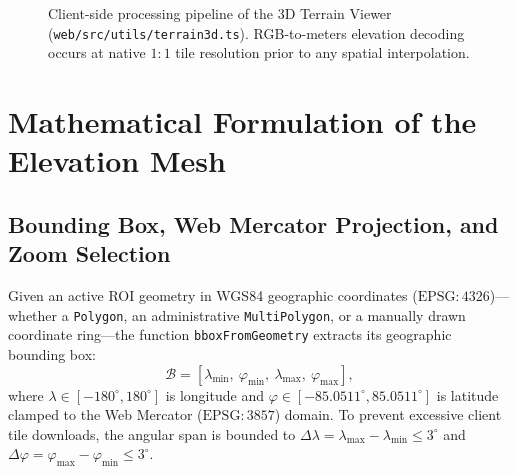 \documentclass[11pt,a4paper]{article}
\newcommand{\src}[1]{\nolinkurl{#1}}
\begin{document}
\begin{figure}[htbp]
\centering
{}
\caption{Client-side processing pipeline of the 3D Terrain Viewer (\src{web/src/utils/terrain3d.ts}).
RGB-to-meters elevation decoding occurs at native $1:1$ tile resolution prior to any spatial interpolation.}
\label{fig:flujo-relieve3d}
\end{figure}

\section{Mathematical Formulation of the Elevation Mesh}
\label{sec:relieve3d-matematicas}

\subsection{Bounding Box, Web Mercator Projection, and Zoom Selection}
\label{sec:relieve3d-mercator}

Given an active ROI geometry in WGS84 geographic coordinates ($\mathrm{EPSG}{:}4326$)---whether a \texttt{Polygon}, an administrative \texttt{MultiPolygon}, or a manually drawn coordinate ring---the function \texttt{bboxFromGeometry} extracts its geographic bounding box:
\begin{equation}
  \mathcal{B} = [\lambda_{\min},\ \varphi_{\min},\ \lambda_{\max},\ \varphi_{\max}],
  \label{eq:bbox-relieve}
\end{equation}
where $\lambda\in[-180^\circ,180^\circ]$ is longitude and $\varphi\in[-85.0511^\circ,85.0511^\circ]$ is latitude clamped to the Web Mercator ($\mathrm{EPSG}{:}3857$) domain. To prevent excessive client tile downloads, the angular span is bounded to $\Delta\lambda = \lambda_{\max}-\lambda_{\min}\le 3^\circ$ and $\Delta\varphi = \varphi_{\max}-\varphi_{\min}\le 3^\circ$.
\end{document}
